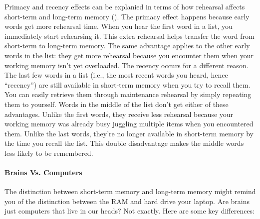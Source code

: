 \documentclass[
]{krantz}
\begin{document}
Primacy and recency effects can be explanied in terms of how rehearsal affects short-term and long-term memory (). The primacy effect happens because early words get more rehearsal time. When you hear the first word in a list, you immediately start rehearsing it. This extra rehearsal helps transfer the word from short-term to long-term memory. The same advantage applies to the other early words in the list: they get more rehearsal because you encounter them when your working memory isn't yet overloaded. The recency occurs for a different reason. The last few words in a list (i.e., the most recent words you heard, hence ``recency'') are still available in short-term memory when you try to recall them. You can easily retrieve them through maintenance rehearsal by simply repeating them to yourself. Words in the middle of the list don't get either of these advantages. Unlike the first words, they receive less rehearsal because your working memory was already busy juggling multiple items when you encountered them. Unlike the last words, they're no longer available in short-term memory by the time you recall the list. This double disadvantage makes the middle words less likely to be remembered.

\paragraph*{Brains Vs. Computers}\label{brains-vs.-computers}

The distinction between short-term memory and long-term memory might remind you of the distinction between the RAM and hard drive your laptop. Are brains just computers that live in our heads? Not exactly. Here are some key differences:
\end{document}
